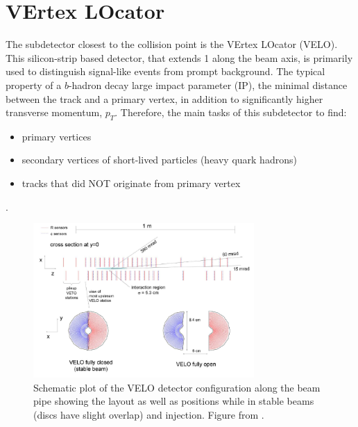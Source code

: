 
\section{VErtex LOcator }
\label{velosys}
The subdetector closest to the collision point is the VErtex LOcator (\Gls{VELO}). This silicon-strip based detector, that extends 1 \m along the beam axis, is primarily used to distinguish signal-like events from prompt background. The typical \DIFdelbegin {}\DIFdelend property of a $b$-hadron decay \DIFdelbegin {}\DIFdelend \DIFaddbegin {}\DIFaddend large impact parameter (\Gls{IP}), the minimal distance between the track and a primary vertex, in addition to significantly higher transverse momentum, $p_{T}$. Therefore, the main tasks of this subdetector \DIFdelbegin {}\DIFdelend \DIFaddbegin {}\DIFaddend to find: 
 \begin{itemize} 
\item primary vertices
\DIFdelbegin {}\DIFdelend \item secondary vertices of short-lived particles (heavy quark hadrons)
\item tracks that did NOT originate from \DIFaddbegin {}\DIFaddend primary vertex
 \end{itemize} .


\begin{figure}[!h]
	\centering
	\includegraphics[width = 0.75\textwidth]{figs/detector/license/Velo_croped.pdf}
	\caption{Schematic plot of the \Gls{VELO} detector configuration along the beam pipe showing the layout as well as positions while in stable beams (discs have slight overlap) and injection. Figure from \cite{det_paper}.}
	\label{fig:veloover}
\end{figure}

